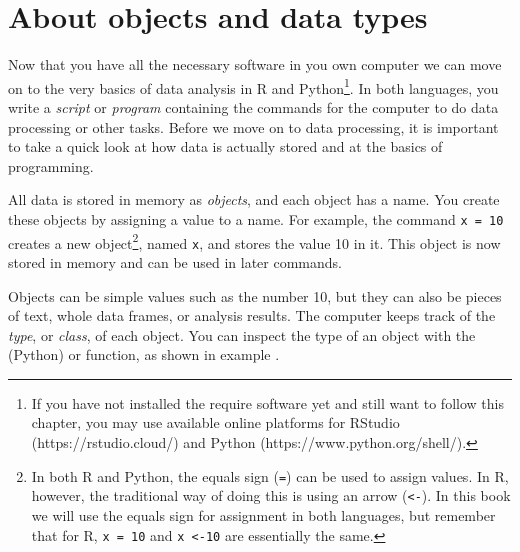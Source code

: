 \newcommand{\fnarrow}{\footnote{In both R and Python, the equals
  sign (\texttt{=}) can be used to assign values. In R, however, the
  traditional way of doing this is using an arrow (\texttt{\textless-}). In
  this book we will use the equals sign for assignment in both
  languages, but remember that for R, \texttt{x = 10} and
  \texttt{x \textless-10} are essentially the same.}}


\section{About objects and data types}
\label{sec:datatypes}

Now that you have all the necessary software in you own computer we
can move on to the very basics of data analysis in R and
Python\footnote{If you have not installed the require software yet and
  still want to follow this chapter, you may use available online
  platforms for RStudio (https://rstudio.cloud/) and Python
  (https://www.python.org/shell/).}.  In both languages, you write a
\emph{script} or \emph{program} containing the commands for the
computer to do data processing or other tasks.  Before we move on to
data processing, it is important to take a quick look at how data is
actually stored and at the basics of programming.

All data is stored in memory as \emph{objects}, and each object
has a name.  You create these objects by
assigning a value to a name. For example, the command \texttt{x = 10}
creates a new object\fnarrow, named \texttt{x}, and stores the value 10
in it.  This object is now stored in memory and can be used in later
commands.


Objects can be simple values such as the number 10, but they can also
be pieces of text, whole data frames, or analysis results.  The
computer keeps track of the \emph{type}, or \emph{class}, of each
object.  You can inspect the type of an object with the 
(Python) or  function, as shown in example . 

